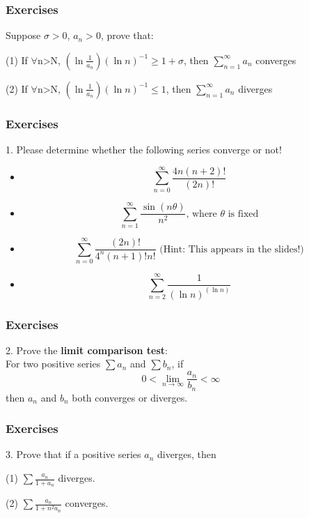\documentclass{beamer}
\begin{document}
\begin{frame}
    \frametitle{Exercises}
    Suppose $\sigma > 0$, $a_n > 0$, prove that:

    (1) If $\forall$n>N, $(\ln \frac{1}{a_n})(\ln n)^{-1}\geq 1+\sigma$, then $\sum_{n=1}^\infty a_n$ converges

    (2) If $\forall$n>N, $(\ln \frac{1}{a_n})(\ln n)^{-1}\leq 1$, then $\sum_{n=1}^\infty a_n$ diverges
\end{frame}

\begin{frame}
    \frametitle{Exercises}
    1. Please determine whether the following series converge or not!
    \begin{itemize}
        \item $$\sum_{n=0}^\infty \frac{4n(n+2)!}{(2n)!}$$
        \item $$\sum_{n=1}^\infty \frac{\sin(n\theta)}{n^2} \text{, where } \theta \text{ is fixed}$$%
        \item $$\sum_{n=0}^\infty \frac{(2n)!}{4^n (n+1)!n!} \text{ (Hint: This appears in the slides!)}$$%
        \item $$\sum_{n=2}^\infty \frac{1}{(\ln n)^{(\ln n)}}$$%
    \end{itemize}
\end{frame}
\begin{frame}
    \frametitle{Exercises}
    2. Prove the \textbf{limit comparison test}:\\
    \vspace{1em}
    For two positive series $\sum a_n$ and $\sum b_n$, if
    $$0< \underset{n \to \infty}{\lim} \frac{a_n}{b_n}< \infty $$
    then $a_n$ and $b_n$ both converges or diverges.

\end{frame}
\begin{frame}
    \frametitle{Exercises}
    3. Prove that if a positive series $a_n$ diverges, then

    (1) $\sum \frac{a_n}{1+a_n}$ diverges.

    (2) $\sum \frac{a_n}{1+n^2a_n}$ converges.
\end{frame}
\end{document}
